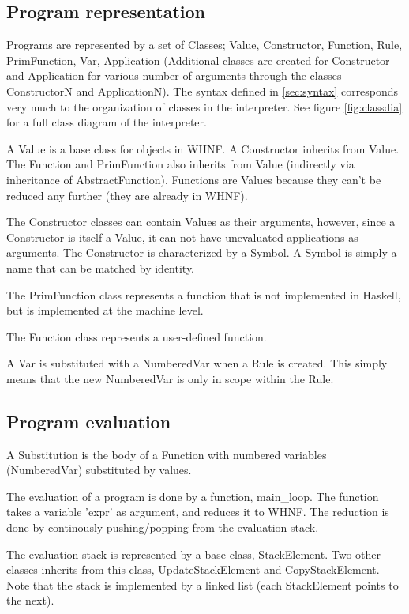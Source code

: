 \subsection{Program representation}

Programs are represented by a set of Classes; Value, Constructor, Function, Rule, 
PrimFunction, Var, Application (Additional classes are created for Constructor
and Application for various number of arguments through the classes ConstructorN 
and ApplicationN). The syntax defined in \ref{sec:syntax} corresponds very much
to the organization of classes in the interpreter. See figure \ref{fig:classdia} 
for a full class diagram of the interpreter.

A Value is a base class for objects in WHNF. A Constructor inherits from Value.
The Function and PrimFunction also inherits from Value (indirectly 
via inheritance of AbstractFunction). Functions are Values because they can't 
be reduced any further (they are already in WHNF).

The Constructor classes can contain Values as their arguments, however, since
a Constructor is itself a Value, it can not have unevaluated applications as
arguments. The Constructor is characterized by a Symbol. A Symbol is simply
a name that can be matched by identity.

The PrimFunction class represents a function that is not implemented in 
Haskell, but is implemented at the machine level.

The Function class represents a user-defined function.

A Var is substituted with a NumberedVar when a Rule is created. This simply
means that the new NumberedVar is only in scope within the Rule.

\subsection{Program evaluation}

A Substitution is the body of a Function with numbered variables 
(NumberedVar) substituted by values.

The evaluation of a program is done by a function, main\_loop. The function
takes a variable 'expr' as argument, and reduces it to WHNF. The reduction is done
by continously pushing/popping from the evaluation stack. 

The evaluation stack is represented by a base class, StackElement. Two other
classes inherits from this class, UpdateStackElement and CopyStackElement. Note that
the stack is implemented by a linked list (each StackElement points to the next).

